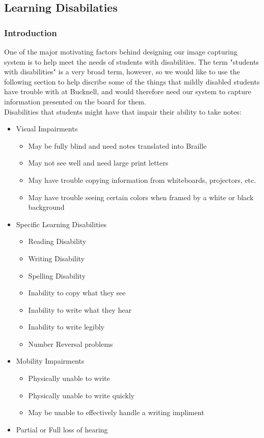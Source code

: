 \documentclass{article}
\begin{document}
\subsection*{Learning Disabilaties}
        \subsubsection*{Introduction}
One of the major motivating factors behind designing our image capturing system is to help meet the needs of students with disabilities. The term "students with disabilities" is a very broad term, however, so we would like to use the following section to help discribe some of the things that mildly disabled students have trouble with at Bucknell, and would therefore need our system to capture information presented on the board for them. \\
Disabilities that students might have that impair their ability to take notes: \cite{disability}
    \begin{itemize}
        \item Visual Impairments
        \begin{itemize}
            \item May be fully blind and need notes translated into Braille
            \item May not see well and need large print letters
            \item May have trouble copying information from whiteboards, projectors, etc.
            \item May have trouble seeing certain colors when framed by a white or black background
        \end{itemize}
        \item Specific Learning Disabilities
        \begin{itemize}
            \item Reading Disability
            \item Writing Disability
            \item Spelling Disability
            \item Inability to copy what they see
            \item Inability to write what they hear
            \item Inability to write legibly
            \item Number Reversal problems
        \end{itemize}
        \item Mobility Impairments
        \begin{itemize}
            \item Physically unable to write
            \item Physically unable to write quickly
            \item May be unable to effectively handle a writing impliment
        \end{itemize}
        \item Partial or Full loss of hearing
    \end{itemize}
\end{document}
